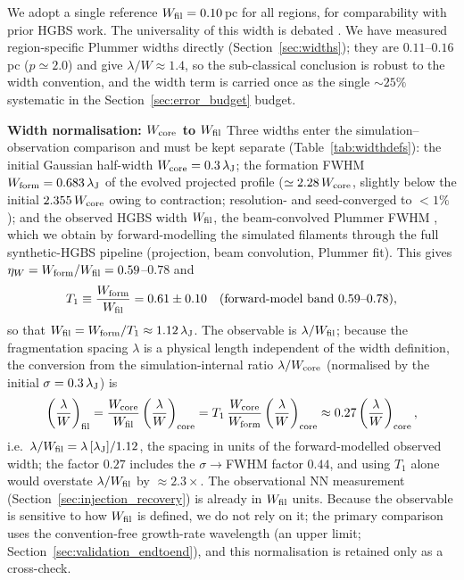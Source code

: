 \documentclass[usenatbib,twoside,twocolumn]{mnras}
\begin{document}
We adopt a single reference $W_{\rm fil}=0.10$\,pc for all regions, for comparability with prior HGBS work. The universality of this width is debated \citep{Panopoulou2017,Panopoulou2022}. We have measured region-specific Plummer widths directly (Section~\ref{sec:widths}); they are $0.11$--$0.16$\,pc ($p\simeq2.0$) and give $\lambda/W\approx1.4$, so the sub-classical conclusion is robust to the width convention, and the width term is carried once as the single $\sim25\%$ systematic in the Section~\ref{sec:error_budget} budget.

\textbf{Width normalisation: $W_{\rm core}$ to $W_{\rm fil}$}
\label{sec:width_correction}
Three widths enter the simulation--observation comparison and must be kept separate (Table~\ref{tab:widthdefs}): the initial Gaussian half-width $W_{\rm core}=0.3\,\lambda_{\rm J}$; the formation FWHM $W_{\rm form}=0.683\,\lambda_{\rm J}$ of the evolved projected profile ($\simeq2.28\,W_{\rm core}$, slightly below the initial $2.355\,W_{\rm core}$ owing to contraction; resolution- and seed-converged to $<1\%$); and the observed HGBS width $W_{\rm fil}$, the beam-convolved Plummer FWHM \citep{Arzoumanian2019}, which we obtain by forward-modelling the simulated filaments through the full synthetic-HGBS pipeline (projection, beam convolution, Plummer fit). This gives $\eta_W=W_{\rm form}/W_{\rm fil}=0.59$--$0.78$ and
\begin{equation}
T_1 \equiv \frac{W_{\rm form}}{W_{\rm fil}} = 0.61 \pm 0.10 \quad (\text{forward-model band } 0.59\text{--}0.78),
\label{eq:t1_correction}
\end{equation}
so that $W_{\rm fil}=W_{\rm form}/T_1\approx1.12\,\lambda_{\rm J}$. The observable is $\lambda/W_{\rm fil}$; because the fragmentation spacing $\lambda$ is a physical length independent of the width definition, the conversion from the simulation-internal ratio $\lambda/W_{\rm core}$ (normalised by the initial $\sigma=0.3\,\lambda_{\rm J}$) is
\begin{equation}
\left(\frac{\lambda}{W}\right)_{\rm fil} = \frac{W_{\rm core}}{W_{\rm fil}}\left(\frac{\lambda}{W}\right)_{\rm core} = T_1\,\frac{W_{\rm core}}{W_{\rm form}}\left(\frac{\lambda}{W}\right)_{\rm core} \approx 0.27\left(\frac{\lambda}{W}\right)_{\rm core},
\label{eq:t1_apply}
\end{equation}
i.e.\ $\lambda/W_{\rm fil}=\lambda\,[\lambda_{\rm J}]/1.12$, the spacing in units of the forward-modelled observed width; the factor $0.27$ includes the $\sigma\!\to\!$FWHM factor $0.44$, and using $T_1$ alone would overstate $\lambda/W_{\rm fil}$ by $\approx2.3\times$. The observational NN measurement (Section~\ref{sec:injection_recovery}) is already in $W_{\rm fil}$ units. Because the observable is sensitive to how $W_{\rm fil}$ is defined, we do not rely on it; the primary comparison uses the convention-free growth-rate wavelength (an upper limit; Section~\ref{sec:validation_endtoend}), and this normalisation is retained only as a cross-check.
\end{document}
